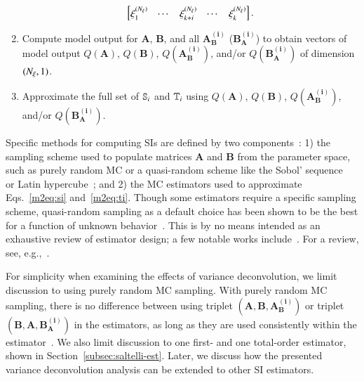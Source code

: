 \begin{enumerate}
\begin{equation}
\begin{bmatrix}
        \xi_1^{(\Nxi)} & \cdots & \xi_{k+i}^{(\Nxi)}   & \cdots & \xi_k^{(\Nxi)}  \\
        \end{bmatrix} .
    \end{equation}
    \item Compute model output for $\bm{A}$, $\bm{B}$, and all $\bm{A_B^{(i)}}$ ($\bm{B_A^{(i)}}$) to obtain vectors of model output $Q(\bm{A})$, $Q(\bm{B})$, $Q(\bm{A_B^{(i)}})$, and/or $Q(\bm{B_A^{(i)}})$ of dimension $(\Nxi,1)$. 
    \item Approximate the full set of $\S{i}$ and $\T{i}$ using $Q(\bm{A})$, $Q(\bm{B})$, $Q(\bm{A_B^{(i)}})$, and/or $Q(\bm{B_A^{(i)}})$.
\end{enumerate}
Specific methods for computing SIs are defined by two components~\cite{piano-etal-2021}: 1) the sampling scheme used to populate matrices $\bm{A}$ and $\bm{B}$ from the parameter space, such as purely random MC or a quasi-random scheme like the Sobol' sequence~\cite{sobol-1967, sobol-1976} or Latin hypercube~\cite{mckay-etal-1979}; and 2) the MC estimators used to approximate Eqs.~\eqref{m2eq:si} and~\eqref{m2eq:ti}. 
Though some estimators require a specific sampling scheme, quasi-random sampling as a default choice has been shown to be the best for a function of unknown behavior~\cite{kucherenko-etal-2015, sensobol-2022}.
This is by no means intended as an exhaustive review of estimator design; a few notable works include~\cite{saltelli-etal-2008, sobol-1993, homma-saltelli-1996, saltelli-2002, saltelli-etal-2010, glen-isaacs-2012, janon-etal-2014, lilburne-tarantola-2009, mara-joseph-2008, mckay-1995, owen-2013, plischke-etal-2013, ratto-etal-2007, sobol-etal-2007, jansen-1999, azzini-etal-2020b, sobol-2001, monod-etal-2006, razavi-gupta-2016a, razavi-gupta-2016b}. 
For a review, see, e.g.,~\cite{puy-etal-2022, saltelli-etal-2010}.

For simplicity when examining the effects of variance deconvolution, we limit discussion to using purely random MC sampling. 
With purely random MC sampling, there is no difference between using triplet $\left( \bm{A}, \bm{B}, \bm{A_B^{(i)}} \right)$ or triplet $\left( \bm{B}, \bm{A}, \bm{B_A^{(i)}} \right)$ in the estimators, as long as they are used consistently within the estimator~\cite{saltelli-etal-2010}.
We also limit discussion to one first- and one total-order estimator, shown in Section~\ref{subsec:saltelli-est}. 
Later, we discuss how the presented variance deconvolution analysis can be extended to other SI estimators. 

